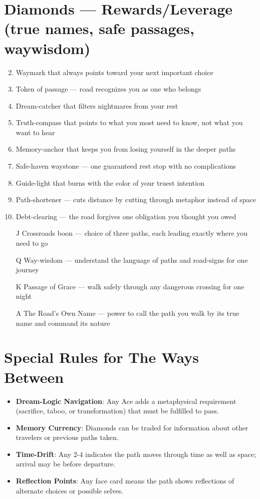 \section*{Diamonds --- Rewards/Leverage (true names, safe passages, waywisdom)}
\label{sec:ways-between-rewards}
\begin{enumerate}
\setcounter{enumi}{1}
\item Waymark that always points toward your next important choice
\item Token of passage --- road recognizes you as one who belongs
\item Dream-catcher that filters nightmares from your rest
\item Truth-compass that points to what you most need to know, not what you want to hear
\item Memory-anchor that keeps you from losing yourself in the deeper paths
\item Safe-haven waystone --- one guaranteed rest stop with no complications
\item Guide-light that burns with the color of your truest intention
\item Path-shortener --- cuts distance by cutting through metaphor instead of space
\item Debt-clearing --- the road forgives one obligation you thought you owed
\item[J] Crossroads boon --- choice of three paths, each leading exactly where you need to go
\item[Q] Way-wisdom --- understand the language of paths and road-signs for one journey
\item[K] Passage of Grace --- walk safely through any dangerous crossing for one night
\item[A] The Road's Own Name --- power to call the path you walk by its true name and command its nature
\end{enumerate}

\section*{Special Rules for The Ways Between}
\label{sec:ways-between-special-rules}
\begin{itemize}
\item \textbf{Dream-Logic Navigation}: Any Ace adds a metaphysical requirement (sacrifice, taboo, or transformation) that must be fulfilled to pass.
\item \textbf{Memory Currency}: Diamonds can be traded for information about other travelers or previous paths taken.
\item \textbf{Time-Drift}: Any 2-4 indicates the path moves through time as well as space; arrival may be before departure.
\item \textbf{Reflection Points}: Any face card means the path shows reflections of alternate choices or possible selves.
\end{itemize}

